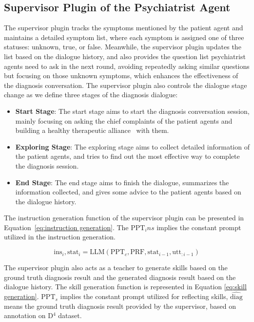 \subsection{Supervisor Plugin of the Psychiatrist Agent}
The supervisor plugin tracks the symptoms mentioned by the patient agent and maintains a detailed symptom list, where each symptom is assigned one of three statuses: unknown, true, or false. Meanwhile, the supervisor plugin updates the list based on the dialogue history, and also provides the question list psychiatrist agents need to ask in the next round, avoiding repeatedly asking similar questions but focusing on those unknown symptoms, which enhances the effectiveness of the diagnosis conversation. The supervisor plugin also controls the dialogue stage change as we define three stages of the diagnosis dialogue:
\begin{itemize}
    \item \textbf{Start Stage}: The start stage aims to start the diagnosis conversation session, mainly focusing on asking the chief complaints of the patient agents and building a healthy therapeutic alliance~\cite{Horvath2011AllianceII} with them. 
    \item \textbf{Exploring Stage}: The exploring stage aims to collect detailed information of the patient agents, and tries to find out the most effective way to complete the diagnosis session.
    \item \textbf{End Stage}: The end stage aims to finish the dialogue, summarizes the information collected, and gives some advice to the patient agents based on the dialogue history. 
\end{itemize}

The instruction generation function of the supervisor plugin can be presented in Equation~\ref{eq:instruction generation}. The $\mathrm{PPT}_ins$ implies the constant prompt utilized in the instruction generation.

\begin{equation}
    \mathrm{ins}_{i}, \mathrm{stat}_i = \mathrm{LLM}(\mathrm{PPT}_c, \mathrm{PRF}, \mathrm{stat}_{i-1}, \mathrm{utt}_{:i-1})
    \label{eq:instruction generation}
\end{equation}

The supervisor plugin also acts as a teacher to generate skills based on the ground truth diagnosis result and the generated diagnosis result based on the dialogue history. The skill generation function is represented in Equation \ref{eq:skill generation}. $\mathrm{PPT}_s$ implies the constant prompt utilized for reflecting skills, $\hat{\mathrm{diag}}$ means the ground truth diagnosis result provided by the supervisor, based on annotation on D$^4$ dataset.

